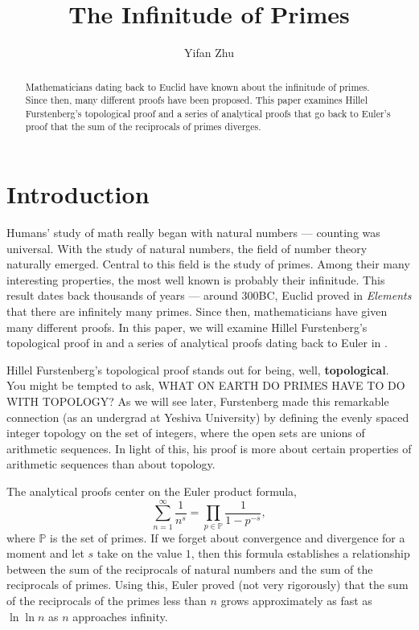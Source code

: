 \documentclass[a4paper]{article}
\theoremstyle{definition}
\theoremstyle{remark}
\begin{document}
\title{The Infinitude of Primes}
\author{
Yifan Zhu
}
\maketitle

\begin{abstract}
  Mathematicians dating back to Euclid have known about the infinitude of primes. Since then, many different proofs have been proposed. This paper examines Hillel Furstenberg's topological proof and a series of analytical proofs that go back to Euler's proof that the sum of the reciprocals of primes diverges.
\end{abstract}

\section{Introduction}
Humans' study of math really began with natural numbers --- counting was universal. With the study of natural numbers, the field of number theory naturally emerged. Central to this field is the study of primes. Among their many interesting properties, the most well known is probably their infinitude. This result dates back thousands of years --- around 300BC, Euclid proved in \textit{Elements} that there are infinitely many primes. \cite{bib:mathHistory} Since then, mathematicians have given many different proofs. In this paper, we will examine Hillel Furstenberg's topological proof in  and a series of analytical proofs dating back to Euler in .

Hillel Furstenberg's topological proof stands out for being, well, \textbf{topological}. You might be tempted to ask, {WHAT ON EARTH DO PRIMES HAVE TO DO WITH TOPOLOGY?} As we will see later, Furstenberg made this remarkable connection (as an undergrad at Yeshiva University) by defining the evenly spaced integer topology on the set of integers, where the open sets are unions of arithmetic sequences. In light of this, his proof is more about certain properties of arithmetic sequences than about topology. \cite{bib:Furstenberg} \cite{bib:proofsFromTheBook} 

The analytical proofs center on the Euler product formula,
\[
\sum^\infty_{n=1}\frac{1}{n^s}=\prod_{p\in\mathbb{P}}\frac{1}{1-p^{-s}}
,
\]
where $\mathbb{P}$ is the set of primes.
If we forget about convergence and divergence for a moment and let $s$ take on the value $1$, then this formula establishes a relationship between the sum of the reciprocals of natural numbers and the sum of the reciprocals of primes. Using this, Euler proved (not very rigorously) that the sum of the reciprocals of the primes less than $n$ grows approximately as fast as $\ln\ln n$ as $n$ approaches infinity.
\end{document}

